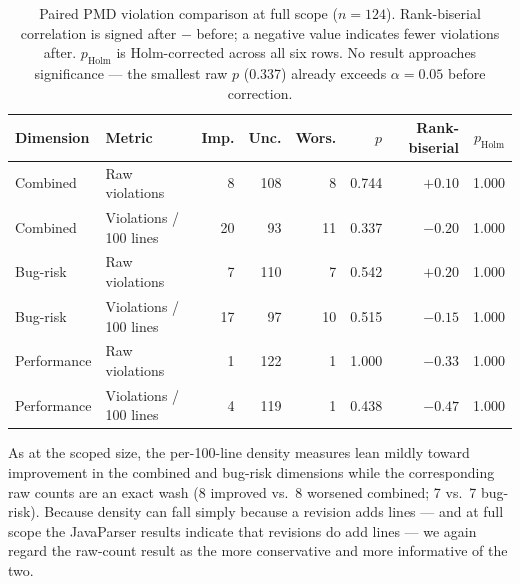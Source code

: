 \begin{table}[htbp]
\centering
\caption{Paired PMD violation comparison at full scope ($n=124$).
Rank-biserial correlation is signed after $-$ before; a negative value indicates fewer violations after.
$p_{\text{Holm}}$ is Holm-corrected across all six rows.
No result approaches significance --- the smallest raw $p$ (0.337) already exceeds $\alpha=0.05$ before correction.}
\label{tab:ba-full-pmd}
\small
\begin{tabular}{llrrrrrr}
\toprule
Dimension & Metric & Imp. & Unc. & Wors. & $p$ & Rank-biserial & $p_{\text{Holm}}$ \\
\midrule
Combined     & Raw violations         & 8  & 108 & 8 & 0.744 & $+0.10$ & 1.000 \\
Combined     & Violations / 100 lines & 20 & 93  & 11 & 0.337 & $-0.20$ & 1.000 \\
Bug-risk     & Raw violations         & 7  & 110 & 7 & 0.542 & $+0.20$ & 1.000 \\
Bug-risk     & Violations / 100 lines & 17 & 97  & 10 & 0.515 & $-0.15$ & 1.000 \\
Performance  & Raw violations         & 1  & 122 & 1 & 1.000 & $-0.33$ & 1.000 \\
Performance  & Violations / 100 lines & 4  & 119 & 1 & 0.438 & $-0.47$ & 1.000 \\
\bottomrule
\end{tabular}
\end{table}

As at the scoped size, the per-100-line density measures lean mildly toward improvement in the combined and bug-risk dimensions while the corresponding raw counts are an exact wash (8 improved vs.\ 8 worsened combined; 7 vs.\ 7 bug-risk).
Because density can fall simply because a revision adds lines --- and at full scope the JavaParser results indicate that revisions do add lines --- we again regard the raw-count result as the more conservative and more informative of the two.

